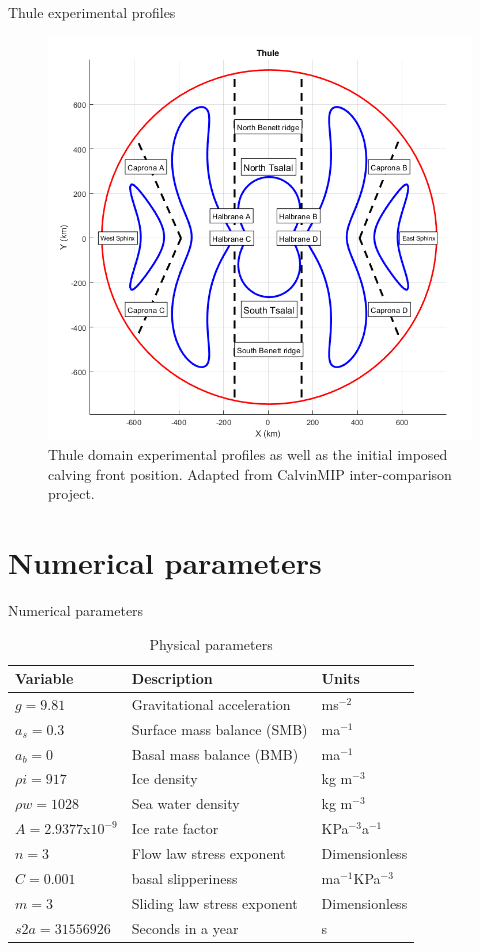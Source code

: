 \documentclass[11pt]{beamer}
\begin{document}
			\begin{frame}{Thule experimental profiles}
			\begin{figure}
				\centering
				\includegraphics[width=0.5\linewidth]{../fig/thule.png}
				\caption{Thule domain experimental profiles as well as the initial imposed calving front position. Adapted from CalvinMIP inter-comparison project.}
				\label{thule_profile}
			\end{figure}
			\end{frame}
		
\section{Numerical parameters}
	\begin{frame}{Numerical parameters}
		\justifying
		\begin{table}
			\begin{center}
				\caption{Physical parameters}
				\label{Physical constants}
				\begin{tabular}{|l|l|l|}
					\hline
					Variable          & Description                 & Units           \\ \hline
					$g=9.81$         & Gravitational acceleration  & ms$^{-2}$         \\ \hline
					$a_s=0.3$       & Surface mass balance (SMB)  & ma$^{-1}$         \\ \hline
					$a_b=0$             & Basal mass balance (BMB)    &   ma$^{-1}$         \\ \hline
					$\rho i=917$        & Ice density                 & kg m$^{-3}$       \\ \hline
					$\rho w=1028$      & Sea water density           & kg m$^{-3}$       \\ \hline
					$A= 2.9377$x$10^{-9}$ & Ice rate factor             & KPa$^{-3}$a$^{-1}$  \\ \hline
					$n=3$               & Flow law stress exponent    &  Dimensionless               \\ \hline
					$C=0.001$           & basal slipperiness          & ma$^{-1}$KPa$^{-3}$ \\ \hline
					$m=3$               & Sliding law stress exponent &   Dimensionless              \\ \hline
					$s2a=31556926$     & Seconds in a year           & s         \\ \hline
				\end{tabular}
			\end{center}
		\end{table}
	\end{frame}
\end{document}
